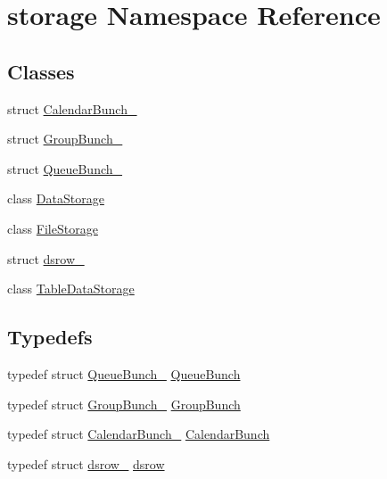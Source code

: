 \hypertarget{namespacestorage}{
\section{storage Namespace Reference}
\label{d0/daa/namespacestorage}
}
\subsection*{Classes}
\begin{DoxyCompactItemize}
\item 
struct \hyperlink{structstorage_1_1CalendarBunch__}{CalendarBunch\_\-}
\item 
struct \hyperlink{structstorage_1_1GroupBunch__}{GroupBunch\_\-}
\item 
struct \hyperlink{structstorage_1_1QueueBunch__}{QueueBunch\_\-}
\item 
class \hyperlink{classstorage_1_1DataStorage}{DataStorage}
\item 
class \hyperlink{classstorage_1_1FileStorage}{FileStorage}
\item 
struct \hyperlink{structstorage_1_1dsrow__}{dsrow\_\-}
\item 
class \hyperlink{classstorage_1_1TableDataStorage}{TableDataStorage}
\end{DoxyCompactItemize}
\subsection*{Typedefs}
\begin{DoxyCompactItemize}
\item 
typedef struct \hyperlink{structstorage_1_1QueueBunch__}{QueueBunch\_\-} \hyperlink{namespacestorage_a1434d2eb1851911feb0d96bcebbe67b4}{QueueBunch}
\item 
typedef struct \hyperlink{structstorage_1_1GroupBunch__}{GroupBunch\_\-} \hyperlink{namespacestorage_a0e84e70cce6b3f424ada280421e39929}{GroupBunch}
\item 
typedef struct \hyperlink{structstorage_1_1CalendarBunch__}{CalendarBunch\_\-} \hyperlink{namespacestorage_a47a941864de57d132a90257532a3f5a4}{CalendarBunch}
\item 
typedef struct \hyperlink{structstorage_1_1dsrow__}{dsrow\_\-} \hyperlink{namespacestorage_a84e19b67e9af2b43bf856350014b7ae2}{dsrow}
\end{DoxyCompactItemize}
